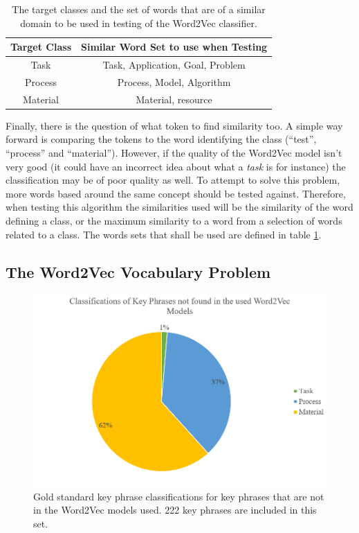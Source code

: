 \begin{table}
	\centering
	\begin{tabular}{ c | c }
		\textbf{Target Class} & \textbf{Similar Word Set to use when Testing} \\
		\hline
		Task & Task, Application, Goal, Problem \\
		 \hline
		Process & Process, Model, Algorithm\\
		 \hline
		Material & Material, resource \\
	\end{tabular}
	\caption[Word2Vec Classification Target Words]{The target classes and the set of words that are of a similar domain to be used in testing of the Word2Vec classifier.}
	\label{table:w2vclasswords}
\end{table}

Finally, there is the question of what token to find similarity too. A simple way forward is comparing the tokens to the word identifying the class (``test'', ``process'' and ``material''). However, if the quality of the Word2Vec model isn't very good (it could have an incorrect idea about what a \textit{task} is for instance) the classification may be of poor quality as well. To attempt to solve this problem, more words based around the same concept should be tested against. Therefore, when testing this algorithm the similarities used will be the similarity of the word defining a class, or the maximum similarity to a word from a selection of words related to a class. The words sets that shall be used are defined in table \ref{table:w2vclasswords}.

\subsection{The Word2Vec Vocabulary Problem}

\begin{figure}
	\centering
	\includegraphics[width=12cm]{img/w2vbadtokensclasses.png}
	\caption[Key Phrase Classifications not in Word2Vec Model]{Gold standard key phrase classifications for key phrases that are not in the Word2Vec models used. 222 key phrases are included in this set.}
	\label{figure:w2vbadtokensclasses}
\end{figure}

